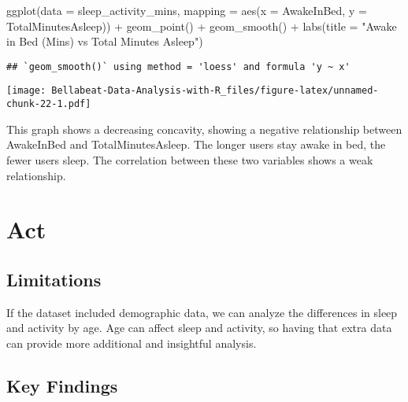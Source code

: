 \documentclass[
]{article}
\newenvironment{Shaded}{\begin{snugshade}}{\end{snugshade}}
\newcommand{\AttributeTok}[1]{\textcolor[rgb]{0.77,0.63,0.00}{#1}}
\newcommand{\FunctionTok}[1]{\textcolor[rgb]{0.00,0.00,0.00}{#1}}
\newcommand{\NormalTok}[1]{#1}
\newcommand{\SpecialCharTok}[1]{\textcolor[rgb]{0.00,0.00,0.00}{#1}}
\newcommand{\StringTok}[1]{\textcolor[rgb]{0.31,0.60,0.02}{#1}}
\begin{document}
\begin{Shaded}
\begin{Highlighting}[]
\FunctionTok{ggplot}\NormalTok{(}\AttributeTok{data =}\NormalTok{ sleep\_activity\_mins, }\AttributeTok{mapping =} \FunctionTok{aes}\NormalTok{(}\AttributeTok{x =}\NormalTok{ AwakeInBed, }\AttributeTok{y =}\NormalTok{ TotalMinutesAsleep)) }\SpecialCharTok{+} 
  \FunctionTok{geom\_point}\NormalTok{() }\SpecialCharTok{+} 
  \FunctionTok{geom\_smooth}\NormalTok{() }\SpecialCharTok{+}
  \FunctionTok{labs}\NormalTok{(}\AttributeTok{title =} \StringTok{"Awake in Bed (Mins) vs Total Minutes Asleep"}\NormalTok{)}
\end{Highlighting}
\end{Shaded}

\begin{verbatim}
## `geom_smooth()` using method = 'loess' and formula 'y ~ x'
\end{verbatim}

\texttt{[image: Bellabeat-Data-Analysis-with-R\_files/figure-latex/unnamed-chunk-22-1.pdf]}

This graph shows a decreasing concavity, showing a negative relationship
between AwakeInBed and TotalMinutesAsleep. The longer users stay awake
in bed, the fewer users sleep. The correlation between these two
variables shows a weak relationship.

\hypertarget{act}{%
\section{Act}\label{act}}

\hypertarget{limitations-1}{%
\subsection{Limitations}\label{limitations-1}}

If the dataset included demographic data, we can analyze the differences
in sleep and activity by age. Age can affect sleep and activity, so
having that extra data can provide more additional and insightful
analysis.

\hypertarget{key-findings}{%
\subsection{Key Findings}\label{key-findings}}
\end{document}
